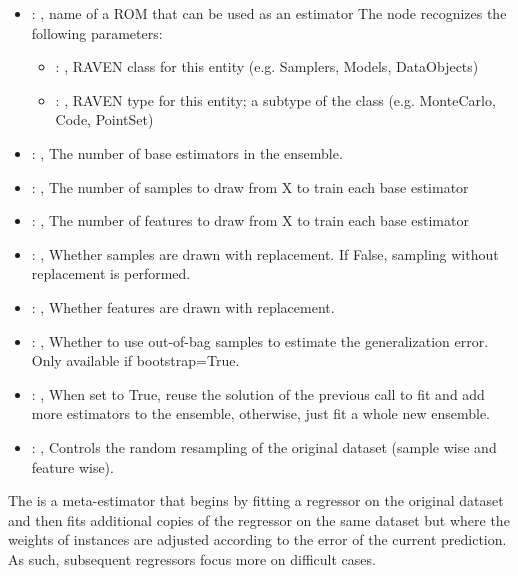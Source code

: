 \begin{itemize}
    \item {}: , 
      name of a ROM that can be used as an estimator
      The  node recognizes the following parameters:
        \begin{itemize}
          \item {}: , 
            RAVEN class for this entity (e.g. Samplers, Models, DataObjects)
          \item {}: , 
            RAVEN type for this entity; a subtype of the class (e.g. MonteCarlo, Code, PointSet)
      \end{itemize}

    \item {}: , 
      The number of base estimators in the ensemble.

    \item {}: , 
      The number of samples to draw from X to train each base estimator

    \item {}: , 
      The number of features to draw from X to train each base estimator

    \item {}: , 
      Whether samples are drawn with replacement. If False, sampling without
      replacement is performed.

    \item {}: , 
      Whether features are drawn with replacement.

    \item {}: , 
      Whether to use out-of-bag samples to estimate the generalization error.
      Only available if bootstrap=True.

    \item {}: , 
      When set to True, reuse the solution of the previous call to fit and add more
      estimators to the ensemble, otherwise, just fit a whole new ensemble.

    \item {}: , 
      Controls the random resampling of the original dataset (sample wise and feature wise).
  \end{itemize}
 The  is a meta-estimator that begins by fitting a regressor on
 the original dataset and then fits additional copies of the regressor on the same dataset
 but where the weights of instances are adjusted according to the error of the current
 prediction. As such, subsequent regressors focus more on difficult cases.

